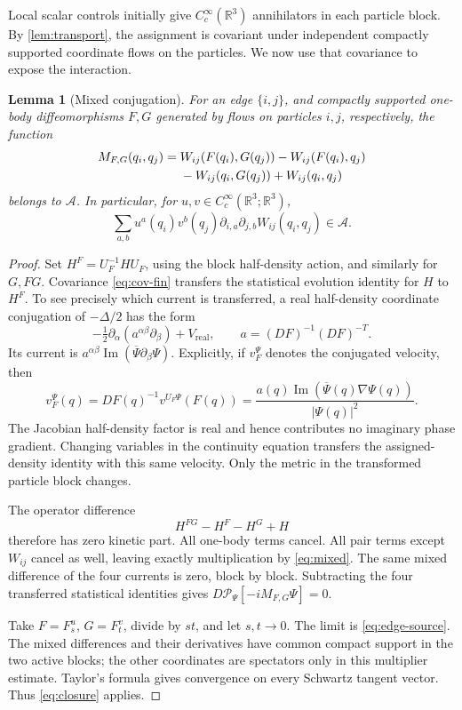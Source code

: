 \documentclass[11pt]{article}
\numberwithin{equation}{section}
\newtheorem{lemma}[lemma]{Lemma}
\theoremstyle{definition}
\newcommand{\R}{\mathbb R}
\newcommand{\Cc}{C_c^\infty}
\newcommand{\Pcal}{\mathcal P}
\newcommand{\Acal}{\mathcal A}
\begin{document}
Local scalar controls initially give \(\Cc(\R^3)\) annihilators in each particle block. By \cref{lem:transport}, the assignment is covariant under independent compactly supported coordinate flows on the particles. We now use that covariance to expose the interaction.

\begin{lemma}[Mixed conjugation]\label{lem:mixed}
For an edge \(\{i,j\}\), and compactly supported one-body diffeomorphisms \(F,G\) generated by flows on particles \(i,j\), respectively, the function
\begin{align}
 M_{F,G}(q_i,q_j)={}&W_{ij}(F(q_i),G(q_j))
 -W_{ij}(F(q_i),q_j)\notag\\
 &-W_{ij}(q_i,G(q_j))+W_{ij}(q_i,q_j)
 \label{eq:mixed}
\end{align}
belongs to \(\Acal\).
In particular, for \(u,v\in\Cc(\R^3;\R^3)\),
\begin{equation}\label{eq:edge-source}
 \sum_{a,b}u^a(q_i)v^b(q_j)
 \partial_{i,a}\partial_{j,b}W_{ij}(q_i,q_j)\in\Acal.
\end{equation}
\end{lemma}

\begin{proof}
Set \(H^F=U_F^{-1}HU_F\), using the block half-density action, and similarly for \(G,FG\). Covariance \eqref{eq:cov-fin} transfers the statistical evolution identity for \(H\) to \(H^F\). To see precisely which current is transferred, a real half-density coordinate conjugation of \(-\Delta/2\) has the form
\[
 -\tfrac12\partial_\alpha(a^{\alpha\beta}\partial_\beta)+V_{\mathrm{real}},
 \qquad a=(DF)^{-1}(DF)^{-T}.
\]
Its current is \(a^{\alpha\beta}\operatorname{Im}(\overline\Psi\partial_\beta\Psi)\). Explicitly, if \(v_F^\Psi\) denotes the conjugated velocity, then
\[
 v_F^\Psi(q)=DF(q)^{-1}v^{U_F\Psi}(F(q))
 =\frac{a(q)\operatorname{Im}(\overline\Psi(q)\nabla\Psi(q))}{|\Psi(q)|^2}.
\]
The Jacobian half-density factor is real and hence contributes no imaginary phase gradient. Changing variables in the continuity equation transfers the assigned-density identity with this same velocity. Only the metric in the transformed particle block changes.

The operator difference
\[
 H^{FG}-H^F-H^G+H
\]
therefore has zero kinetic part. All one-body terms cancel. All pair terms except \(W_{ij}\) cancel as well, leaving exactly multiplication by \eqref{eq:mixed}. The same mixed difference of the four currents is zero, block by block. Subtracting the four transferred statistical identities gives \(D\Pcal_\Psi[-iM_{F,G}\Psi]=0\).

Take \(F=F_s^u\), \(G=F_t^v\), divide by \(st\), and let \(s,t\to0\). The limit is \eqref{eq:edge-source}. The mixed differences and their derivatives have common compact support in the two active blocks; the other coordinates are spectators only in this multiplier estimate. Taylor's formula gives convergence on every Schwartz tangent vector. Thus \eqref{eq:closure} applies.
\end{proof}
\end{document}
